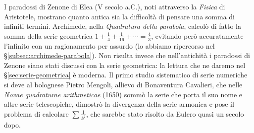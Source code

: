 \begin{notastorica}
I paradossi di Zenone di Elea (V secolo a.C.), noti attraverso la \emph{Fisica} di
Aristotele, mostrano quanto antica sia la difficoltà di pensare una somma di infiniti
termini. Archimede, nella \emph{Quadratura della parabola}, calcolò di fatto la somma
della serie geometrica $1+\frac14+\frac1{16}+\cdots=\frac43$, evitando però accuratamente
l'infinito con un ragionamento per assurdo (lo abbiamo ripercorso nel
\S\ref{subsec:archimede-parabola}). Non risulta invece che nell'antichità i
paradossi di Zenone siano stati discussi con la serie geometrica: la lettura che ne
daremo nel \S\ref{sec:serie-geometrica} è moderna. Il primo studio sistematico di serie
numeriche si deve al bolognese Pietro Mengoli, allievo di Bonaventura Cavalieri, che nelle
\emph{Novae quadraturae arithmeticae} (1650) sommò la serie che porta il suo nome e altre
serie telescopiche, dimostrò la divergenza della serie armonica e pose il problema di
calcolare $\sum\frac1{k^{2}}$, che sarebbe stato risolto da Eulero quasi un secolo dopo.
\end{notastorica}

